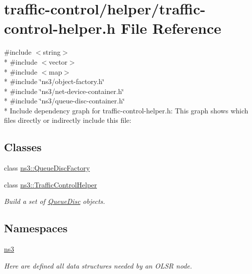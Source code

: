 \hypertarget{traffic-control-helper_8h}{}\section{traffic-\/control/helper/traffic-\/control-\/helper.h File Reference}
\label{traffic-control-helper_8h}
{\ttfamily \#include $<$string$>$}\\*
{\ttfamily \#include $<$vector$>$}\\*
{\ttfamily \#include $<$map$>$}\\*
{\ttfamily \#include \char`\"{}ns3/object-\/factory.\+h\char`\"{}}\\*
{\ttfamily \#include \char`\"{}ns3/net-\/device-\/container.\+h\char`\"{}}\\*
{\ttfamily \#include \char`\"{}ns3/queue-\/disc-\/container.\+h\char`\"{}}\\*
Include dependency graph for traffic-\/control-\/helper.h\+:
This graph shows which files directly or indirectly include this file\+:
\subsection*{Classes}
\begin{DoxyCompactItemize}
\item 
class \hyperlink{classns3_1_1QueueDiscFactory}{ns3\+::\+Queue\+Disc\+Factory}
\item 
class \hyperlink{classns3_1_1TrafficControlHelper}{ns3\+::\+Traffic\+Control\+Helper}
\begin{DoxyCompactList}\small\item\em Build a set of \hyperlink{classns3_1_1QueueDisc}{Queue\+Disc} objects. \end{DoxyCompactList}\end{DoxyCompactItemize}
\subsection*{Namespaces}
\begin{DoxyCompactItemize}
\item 
 \hyperlink{namespacens3}{ns3}
\begin{DoxyCompactList}\small\item\em Here are defined all data structures needed by an O\+L\+SR node. \end{DoxyCompactList}\end{DoxyCompactItemize}
